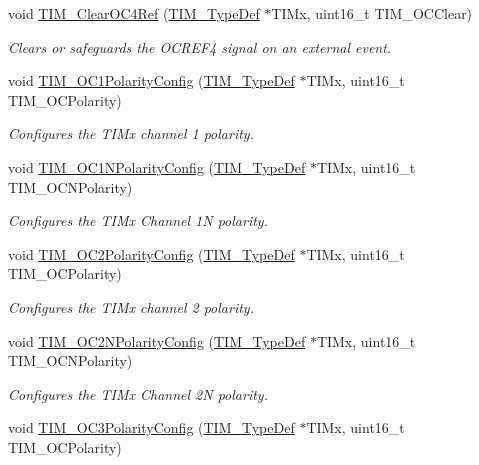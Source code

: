 \begin{DoxyCompactItemize}
void \hyperlink{group___t_i_m___group2_gaeee5fa66b26e7c6f71850272dc3028f3}{T\+I\+M\+\_\+\+Clear\+O\+C4\+Ref} (\hyperlink{struct_t_i_m___type_def}{T\+I\+M\+\_\+\+Type\+Def} $\ast$T\+I\+Mx, uint16\+\_\+t T\+I\+M\+\_\+\+O\+C\+Clear)
\begin{DoxyCompactList}\small\item\em Clears or safeguards the O\+C\+R\+E\+F4 signal on an external event. \end{DoxyCompactList}\item 
void \hyperlink{group___t_i_m___group2_ga03878f78163485c8a3508cff2111c297}{T\+I\+M\+\_\+\+O\+C1\+Polarity\+Config} (\hyperlink{struct_t_i_m___type_def}{T\+I\+M\+\_\+\+Type\+Def} $\ast$T\+I\+Mx, uint16\+\_\+t T\+I\+M\+\_\+\+O\+C\+Polarity)
\begin{DoxyCompactList}\small\item\em Configures the T\+I\+Mx channel 1 polarity. \end{DoxyCompactList}\item 
void \hyperlink{group___t_i_m___group2_ga3cb91578e7dd34ea7d09862482960445}{T\+I\+M\+\_\+\+O\+C1\+N\+Polarity\+Config} (\hyperlink{struct_t_i_m___type_def}{T\+I\+M\+\_\+\+Type\+Def} $\ast$T\+I\+Mx, uint16\+\_\+t T\+I\+M\+\_\+\+O\+C\+N\+Polarity)
\begin{DoxyCompactList}\small\item\em Configures the T\+I\+Mx Channel 1N polarity. \end{DoxyCompactList}\item 
void \hyperlink{group___t_i_m___group2_ga6831cacaac1ef50291af94db94450797}{T\+I\+M\+\_\+\+O\+C2\+Polarity\+Config} (\hyperlink{struct_t_i_m___type_def}{T\+I\+M\+\_\+\+Type\+Def} $\ast$T\+I\+Mx, uint16\+\_\+t T\+I\+M\+\_\+\+O\+C\+Polarity)
\begin{DoxyCompactList}\small\item\em Configures the T\+I\+Mx channel 2 polarity. \end{DoxyCompactList}\item 
void \hyperlink{group___t_i_m___group2_ga2fa6ea3a89f446b52b4e699272b70cad}{T\+I\+M\+\_\+\+O\+C2\+N\+Polarity\+Config} (\hyperlink{struct_t_i_m___type_def}{T\+I\+M\+\_\+\+Type\+Def} $\ast$T\+I\+Mx, uint16\+\_\+t T\+I\+M\+\_\+\+O\+C\+N\+Polarity)
\begin{DoxyCompactList}\small\item\em Configures the T\+I\+Mx Channel 2N polarity. \end{DoxyCompactList}\item 
void \hyperlink{group___t_i_m___group2_ga1ef43b03fe666495e80aac9741ae7ab0}{T\+I\+M\+\_\+\+O\+C3\+Polarity\+Config} (\hyperlink{struct_t_i_m___type_def}{T\+I\+M\+\_\+\+Type\+Def} $\ast$T\+I\+Mx, uint16\+\_\+t T\+I\+M\+\_\+\+O\+C\+Polarity)

\end{DoxyCompactItemize}

